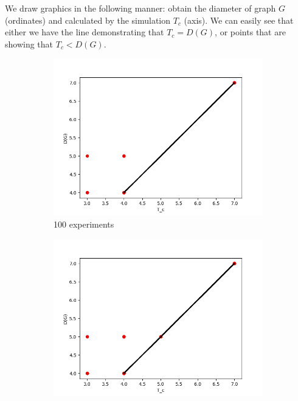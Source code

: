 \documentclass[a4paper,14pt]{llncs}
\begin{document}
We draw graphics in the following manner: obtain the diameter of graph $G$ (ordinates) and calculated by the simulation $T_c$ (axis). We can easily see that either we have the line demonstrating that $T_c = D(G)$, or
points that are showing that $T_c < D(G)$.
%
\begin{figure}[p]\label{pic:diagram}
\begin{subfigure}{0.3\linewidth}
\centering\includegraphics[width=\linewidth]{images/100-consistency-convergence.png}
\caption{100 experiments}\label{pic:100}
\end{subfigure}
\begin{subfigure}{0.3\linewidth}
\centering\includegraphics[width=\linewidth]{images/200-consistency-convergence.png}

\end{subfigure}
\end{figure}
\end{document}
